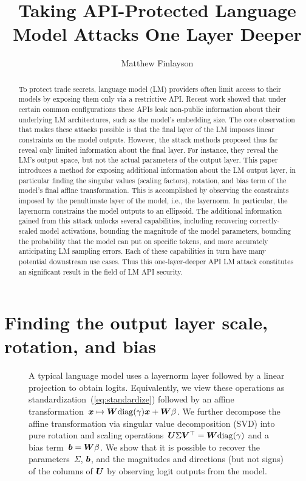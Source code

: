 \documentclass{article}
\author{Matthew Finlayson}
\title{Taking API-Protected Language Model Attacks One Layer Deeper}
\date{}
\newcommand\diag{\mathrm{diag}}
\begin{document}
\maketitle

\begin{abstract}
  To protect trade secrets, 
  language model (LM) providers often limit access to their models
  by exposing them only via a restrictive API.
  Recent work showed that under certain common configurations 
  these APIs leak non-public information 
  about their underlying LM architectures,
  such as the model's embedding size.
  The core observation that makes these attacks possible
  is that the final layer of the LM imposes linear constraints
  on the model outputs.
  However, the attack methods proposed thus far reveal only limited information 
  about the final layer.
  For instance, they reveal the LM's output space,
  but not the actual parameters of the output layer.
  This paper introduces a method 
  for exposing additional information about the LM output layer,
  in particular finding the singular values (scaling factors),
  rotation, and bias term of the model's final affine transformation.
  This is accomplished by observing the constraints 
  imposed by the penultimate layer of the model, i.e., the layernorm.
  In particular, the layernorm constrains the model outputs to an ellipsoid.
  The additional information gained from this attack unlocks several capabilities,
  including recovering correctly-scaled model activations,
  bounding the magnitude of the model parameters,
  bounding the probability that the model can put on specific tokens,
  and more accurately anticipating LM sampling errors.
  Each of these capabilities in turn have many potential downstream use cases.
  Thus this one-layer-deeper API LM attack 
  constitutes an significant result in the field of LM API security.
\end{abstract}

\section{Finding the output layer scale, rotation, and bias}

\begin{figure}
  \centering
  \small
  
  \caption{
    A typical language model uses a layernorm layer 
    followed by a linear projection to obtain logits.
    Equivalently, we view these operations as standardization~(\ref{eq:standardize}) 
    followed by an affine transformation~\(\vx\mapsto\mW\diag(\gamma)\vx+\mW\beta\). 
    We further decompose the affine transformation 
    via singular value decomposition (SVD) 
    into pure rotation and scaling 
    operations~\(\mU\Sigma\mV^\top=\mW\diag(\gamma)\)
    and a bias term~\({\bm{b}}={\bm{W}}\beta\).
    We show that it is possible to recover the parameters~\(\Sigma\), \({\bm{b}}\),
    and the magnitudes and directions (but not signs) of the columns of \({\bm{U}}\)
    by observing logit outputs from the model.
  }
  \label{fig:arch}
\end{figure}
\end{document}
